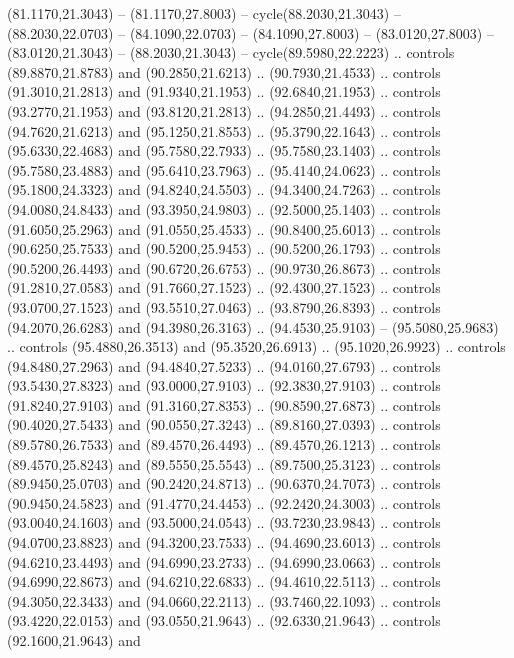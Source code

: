 \begin{scope}[cm={{1.25,0.0,0.0,-1.25,(0.0,59.09163)}}]
        (81.1170,21.3043) -- (81.1170,27.8003) -- cycle(88.2030,21.3043) --
        (88.2030,22.0703) -- (84.1090,22.0703) -- (84.1090,27.8003) --
        (83.0120,27.8003) -- (83.0120,21.3043) -- (88.2030,21.3043) --
        cycle(89.5980,22.2223) .. controls (89.8870,21.8783) and (90.2850,21.6213) ..
        (90.7930,21.4533) .. controls (91.3010,21.2813) and (91.9340,21.1953) ..
        (92.6840,21.1953) .. controls (93.2770,21.1953) and (93.8120,21.2813) ..
        (94.2850,21.4493) .. controls (94.7620,21.6213) and (95.1250,21.8553) ..
        (95.3790,22.1643) .. controls (95.6330,22.4683) and (95.7580,22.7933) ..
        (95.7580,23.1403) .. controls (95.7580,23.4883) and (95.6410,23.7963) ..
        (95.4140,24.0623) .. controls (95.1800,24.3323) and (94.8240,24.5503) ..
        (94.3400,24.7263) .. controls (94.0080,24.8433) and (93.3950,24.9803) ..
        (92.5000,25.1403) .. controls (91.6050,25.2963) and (91.0550,25.4533) ..
        (90.8400,25.6013) .. controls (90.6250,25.7533) and (90.5200,25.9453) ..
        (90.5200,26.1793) .. controls (90.5200,26.4493) and (90.6720,26.6753) ..
        (90.9730,26.8673) .. controls (91.2810,27.0583) and (91.7660,27.1523) ..
        (92.4300,27.1523) .. controls (93.0700,27.1523) and (93.5510,27.0463) ..
        (93.8790,26.8393) .. controls (94.2070,26.6283) and (94.3980,26.3163) ..
        (94.4530,25.9103) -- (95.5080,25.9683) .. controls (95.4880,26.3513) and
        (95.3520,26.6913) .. (95.1020,26.9923) .. controls (94.8480,27.2963) and
        (94.4840,27.5233) .. (94.0160,27.6793) .. controls (93.5430,27.8323) and
        (93.0000,27.9103) .. (92.3830,27.9103) .. controls (91.8240,27.9103) and
        (91.3160,27.8353) .. (90.8590,27.6873) .. controls (90.4020,27.5433) and
        (90.0550,27.3243) .. (89.8160,27.0393) .. controls (89.5780,26.7533) and
        (89.4570,26.4493) .. (89.4570,26.1213) .. controls (89.4570,25.8243) and
        (89.5550,25.5543) .. (89.7500,25.3123) .. controls (89.9450,25.0703) and
        (90.2420,24.8713) .. (90.6370,24.7073) .. controls (90.9450,24.5823) and
        (91.4770,24.4453) .. (92.2420,24.3003) .. controls (93.0040,24.1603) and
        (93.5000,24.0543) .. (93.7230,23.9843) .. controls (94.0700,23.8823) and
        (94.3200,23.7533) .. (94.4690,23.6013) .. controls (94.6210,23.4493) and
        (94.6990,23.2733) .. (94.6990,23.0663) .. controls (94.6990,22.8673) and
        (94.6210,22.6833) .. (94.4610,22.5113) .. controls (94.3050,22.3433) and
        (94.0660,22.2113) .. (93.7460,22.1093) .. controls (93.4220,22.0153) and
        (93.0550,21.9643) .. (92.6330,21.9643) .. controls (92.1600,21.9643) and

\end{scope}
